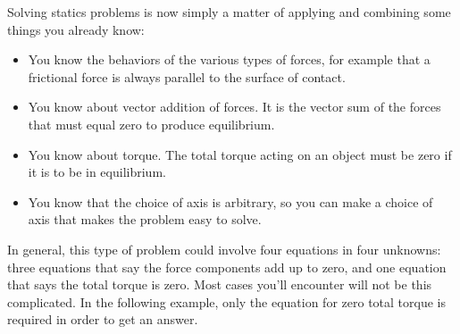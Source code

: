 Solving statics problems is now simply a matter of applying
and combining some things you already know:

\begin{itemize}

\item You know the behaviors of the various types of forces, for
example that a frictional force is always parallel to
the surface of contact.

\item You know about vector addition of forces. It is the vector
sum of the forces that must equal zero to produce equilibrium.

\item You know about torque. The total torque acting on an
object must be zero if it is to be in equilibrium.

\item You know that the choice of axis is arbitrary, so you can
make a choice of axis that makes the problem easy to solve.

\end{itemize}

\noindent In general, this type of problem could involve four
equations in four unknowns: three equations that say the
force components add up to zero, and one equation that says
the total torque is zero. Most cases you'll encounter will
not be this complicated. In the following example, only the
equation for zero total torque is required in order to get an answer.

\vfill\pagebreak[4]

